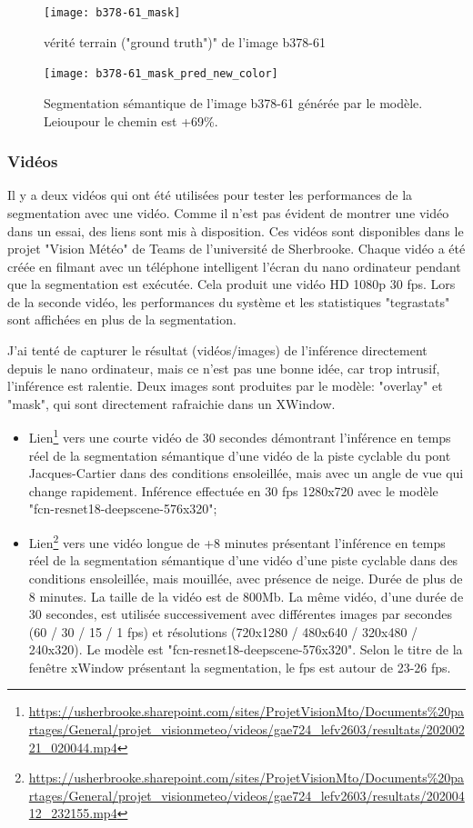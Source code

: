 \begin{figure}[H]
   \centering
   \texttt{[image: b378-61\_mask]}
   \caption{vérité terrain ("ground truth")" de l'image b378-61}
   \label{fig:b378-61_mask}
\end{figure}
\begin{figure}[H]
   \centering
   \texttt{[image: b378-61\_mask\_pred\_new\_color]}
   \caption{Segmentation sémantique de l'image b378-61 générée par le modèle. Le\acrshort{iou}pour le chemin est +69\%.}
   \label{fig:b378-61_mask_pred_new_color}
\end{figure}
\subsubsection{Vidéos}
\par Il y a deux vidéos qui ont été utilisées pour tester les performances de la segmentation avec une vidéo. Comme il n'est pas évident de montrer une vidéo dans un essai, des liens sont mis à disposition. Ces vidéos sont disponibles dans le projet "Vision Météo" de Teams de l'université de Sherbrooke. Chaque vidéo a été créée en filmant avec un téléphone intelligent l'écran du nano ordinateur pendant que la segmentation est exécutée. Cela produit une vidéo HD 1080p 30 \acrshort{fps}. Lors de la seconde vidéo, les performances du système et les statistiques "tegrastats" sont affichées en plus de la segmentation.
\par J'ai tenté de capturer le résultat (vidéos/images) de l'inférence directement depuis le nano ordinateur, mais ce n'est pas une bonne idée, car trop intrusif, l'inférence est ralentie. Deux images sont produites par le modèle: "overlay" et "mask", qui sont directement rafraichie dans un XWindow. 
\begin{itemize}
   \item Lien\footnote{\url{https://usherbrooke.sharepoint.com/sites/ProjetVisionMto/Documents\%20partages/General/projet_visionmeteo/videos/gae724_lefv2603/resultats/20200221_020044.mp4}} vers une courte vidéo de 30 secondes démontrant l'inférence en temps réel de la segmentation sémantique d'une vidéo de la piste cyclable du pont Jacques-Cartier dans des conditions ensoleillée, mais avec un angle de vue qui change rapidement. Inférence effectuée en 30 \acrshort{fps} 1280x720 avec le modèle "fcn-resnet18-deepscene-576x320";
   \item Lien\footnote{\url{https://usherbrooke.sharepoint.com/sites/ProjetVisionMto/Documents\%20partages/General/projet_visionmeteo/videos/gae724_lefv2603/resultats/20200412_232155.mp4}} vers une vidéo longue de +8 minutes présentant l'inférence en temps réel de la segmentation sémantique d'une vidéo d'une piste cyclable dans des conditions ensoleillée, mais mouillée, avec présence de neige. Durée de plus de 8 minutes. La taille de la vidéo est de 800Mb. La même vidéo, d'une durée de 30 secondes, est utilisée successivement avec différentes images par secondes (60 / 30 / 15 / 1 \acrshort{fps}) et résolutions (720x1280 / 480x640 / 320x480 / 240x320). Le modèle est "fcn-resnet18-deepscene-576x320". Selon le titre de la fenêtre xWindow présentant la segmentation, le \acrshort{fps} est autour de 23-26 \acrshort{fps}.
\end{itemize}
